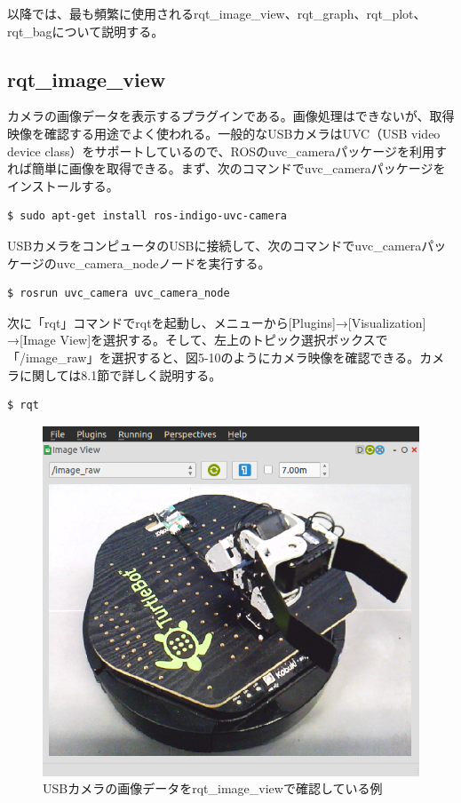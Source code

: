 以降では、最も頻繁に使用されるrqt\_image\_view、rqt\_graph、rqt\_plot、rqt\_bagについて説明する。

\subsection{rqt\_image\_view}

カメラの画像データを表示するプラグインである。画像処理はできないが、取得映像を確認する用途でよく使われる。一般的なUSBカメラはUVC（USB video device class）をサポートしているので、ROSのuvc\_cameraパッケージを利用すれば簡単に画像を取得できる。まず、次のコマンドでuvc\_cameraパッケージをインストールする。

\begin{lstlisting}[language=ROS]
$ sudo apt-get install ros-indigo-uvc-camera
\end{lstlisting}

USBカメラをコンピュータのUSBに接続して、次のコマンドでuvc\_cameraパッケージのuvc\_camera\_nodeノードを実行する。

\begin{lstlisting}[language=ROS]
$ rosrun uvc_camera uvc_camera_node
\end{lstlisting}

次に「rqt」コマンドでrqtを起動し、メニューから[Plugins]→[Visualization] →[Image View]を選択する。そして、左上のトピック選択ボックスで「/image\_raw」を選択すると、図5-10のようにカメラ映像を確認できる。カメラに関しては8.1節で詳しく説明する。

\begin{lstlisting}[language=ROS]
$ rqt
\end{lstlisting}

\begin{figure}[htp]
  \centering
  \includegraphics[width=\columnwidth]{pictures/chapter5/pic_05_10.png}
  \caption{USBカメラの画像データをrqt\_image\_viewで確認している例}
\end{figure}


